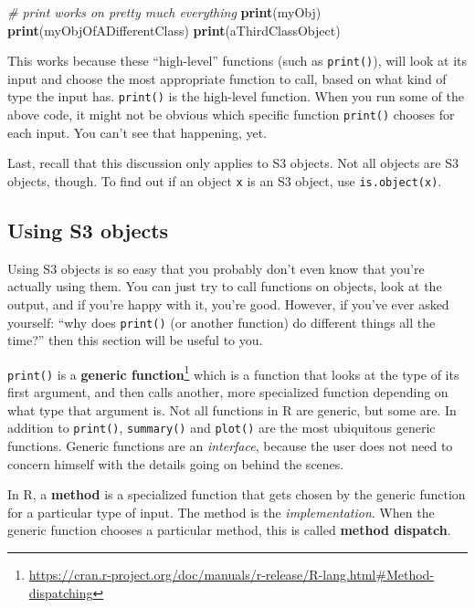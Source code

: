 \documentclass[12pt,krantz2]{krantz}
\makeatletter
\newenvironment{Shaded}{\begin{snugshade}}{\end{snugshade}}
\newcommand{\CommentTok}[1]{\textcolor[rgb]{0.37,0.37,0.37}{\textit{#1}}}
\newcommand{\KeywordTok}[1]{\textcolor[rgb]{0.27,0.27,0.27}{\textbf{#1}}}
\newcommand{\NormalTok}[1]{#1}
\renewcommand{\href}[2]{#2\footnote{\url{#1}}}
\newenvironment{kframe}{%
\medskip{}
\setlength{\fboxsep}{.8em}
 \def\at@end@of@kframe{}%
 \ifinner\ifhmode%
  \def\at@end@of@kframe{\end{minipage}}%
  \begin{minipage}{\columnwidth}%
 \fi\fi%
 \def\FrameCommand##1{\hskip\@totalleftmargin \hskip-\fboxsep
 \colorbox{shadecolor}{##1}\hskip-\fboxsep
     \hskip-\linewidth \hskip-\@totalleftmargin \hskip\columnwidth}%
 \MakeFramed {\advance\hsize-\width
   \@totalleftmargin\z@ \linewidth\hsize
   \@setminipage}}%
 {\par\unskip\endMakeFramed%
 \at@end@of@kframe}
\renewenvironment{Shaded}{\begin{kframe}}{\end{kframe}}
\makeatother
\begin{document}
\begin{Shaded}
\begin{Highlighting}[]
\CommentTok{# print works on pretty much everything}
\KeywordTok{print}\NormalTok{(myObj)}
\KeywordTok{print}\NormalTok{(myObjOfADifferentClass)}
\KeywordTok{print}\NormalTok{(aThirdClassObject)}
\end{Highlighting}
\end{Shaded}

This works because these ``high-level'' functions (such as \texttt{print()}), will look at its input and choose the most appropriate function to call, based on what kind of type the input has. \texttt{print()} is the high-level function. When you run some of the above code, it might not be obvious which specific function \texttt{print()} chooses for each input. You can't see that happening, yet.

Last, recall that this discussion only applies to S3 objects. Not all objects are S3 objects, though. To find out if an object \texttt{x} is an S3 object, use \texttt{is.object(x)}.

\hypertarget{using-s3-objects}{%
\subsection{Using S3 objects}\label{using-s3-objects}}

Using S3 objects is so easy that you probably don't even know that you're actually using them. You can just try to call functions on objects, look at the output, and if you're happy with it, you're good. However, if you've ever asked yourself: ``why does \texttt{print()} (or another function) do different things all the time?'' then this section will be useful to you.

\texttt{print()} is a \href{https://cran.r-project.org/doc/manuals/r-release/R-lang.html\#Method-dispatching}{\textbf{generic function}} which is a function that looks at the type of its first argument, and then calls another, more specialized function depending on what type that argument is. Not all functions in R are generic, but some are. In addition to \texttt{print()}, \texttt{summary()} and \texttt{plot()} are the most ubiquitous generic functions. Generic functions are an \emph{interface}, because the user does not need to concern himself with the details going on behind the scenes.

In R, a \textbf{method} is a specialized function that gets chosen by the generic function for a particular type of input. The method is the \emph{implementation}. When the generic function chooses a particular method, this is called \textbf{method dispatch}.
\end{document}
